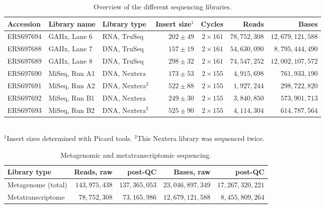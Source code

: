 \documentclass{bmcart}
\begin{document}
\begin{backmatter}
\begin{table}[h!]
\caption{Overview of the different sequencing libraries.}
\begin{tabular}{lllrrrr}
\hline
Accession & Library name & Library type & Insert size$^{1}$ & Cycles & Reads & Bases \\
\hline
ERS697694 & GAIIx, Lane 6 & RNA, TruSeq & $202 \pm 49$ & $2 \times 161$ & $78,752,308$ & $12,679,121,588$ \\
ERS697688 & GAIIx, Lane 7 & DNA, TruSeq & $157 \pm 19$ & $2 \times 161$ & $54,630,090$ & $8,795,444,490$ \\
ERS697689 & GAIIx, Lane 8 & DNA, TruSeq & $298 \pm 32$ & $2 \times 161$ & $74,547,252$ & $12,002,107,572$ \\
ERS697690 & MiSeq, Run A1 & DNA, Nextera & $173 \pm 53$ & $2 \times 155$ & $4,915,698$ & $761,933,190$ \\
ERS697691 & MiSeq, Run A2 & DNA, Nextera$^{2}$ & $522 \pm 88$ & $2 \times 155$ & $1,927,244$ & $298,722,820$ \\
ERS697692 & MiSeq, Run B1 & DNA, Nextera & $249 \pm 30$ & $2 \times 155$ & $3,840,850$ & $573,901,713$ \\
ERS697693 & MiSeq, Run B2 & DNA, Nextera$^{2}$ & $525 \pm 90$ & $2 \times 155$ & $4,114,304$ & $614,787,564$ \\
\hline
\end{tabular}
\label{tReads}
\\$^{1}$Insert sizes determined with Picard tools. $^{2}$This Nextera library was sequenced twice.
\end{table}

\begin{table}[h!]
\caption{Metagenomic and metatranscriptomic sequencing.}
\begin{tabular}{lrrrr}
\hline
Library type & Reads, raw & post-QC & Bases, raw & post-QC\\
\hline
Metagenome (total) & $143,975,438$ & $137,365,053$ & $23,046,897,349$ & $17,267,320,221$ \\
Metatranscriptome & $78,752,308$ & $73,165,986$ & $12,679,121,588$ & $8,455,809,264$ \\
\hline
\end{tabular}
\label{tPostQC}
\end{table}


\end{backmatter}
\end{document}
